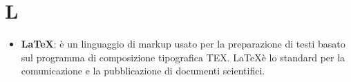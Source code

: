 \section{L}
\begin{itemize} 
	\item
	\textbf{\LaTeX}: è un linguaggio di markup usato per la preparazione di testi basato sul programma di composizione tipografica TEX. \LaTeX è lo standard per la comunicazione e la pubblicazione di documenti scientifici.	
\end{itemize}
